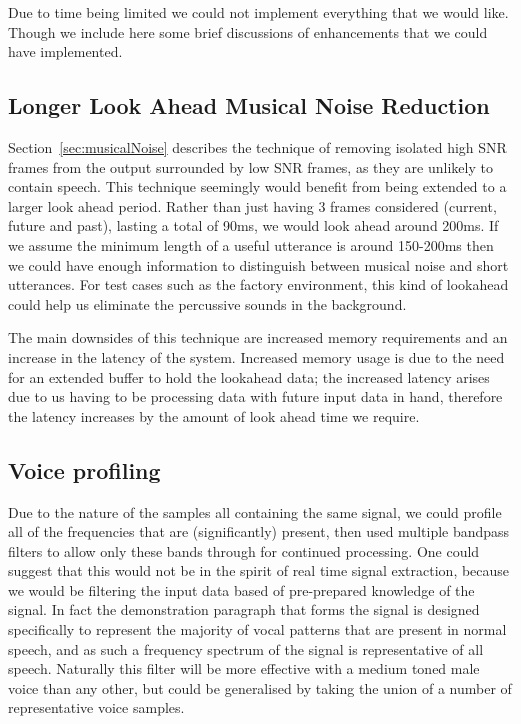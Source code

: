 \documentclass[11pt]{article} %
\begin{document}
{Due to time being limited we could not implement everything that we would like. Though we include here some brief discussions of enhancements that we could have implemented. 

\subsection{Longer Look Ahead Musical Noise Reduction}
Section~\ref{sec:musicalNoise} describes the technique of removing isolated high SNR frames from the output surrounded by low SNR frames, as they are unlikely to contain speech. This technique seemingly would benefit from being extended to a larger look ahead period. Rather than just having 3 frames considered (current, future and past), lasting a total of 90ms, we would look ahead around 200ms.
If we assume the minimum length of a useful utterance is around 150-200ms then we could have enough information to distinguish between musical noise and short utterances. For test cases such as the factory environment, this kind of lookahead could help us eliminate the percussive sounds in the background. 

The main downsides of this technique are increased memory requirements and an increase in the latency of the system. Increased memory usage is due to the need for an extended buffer to hold the lookahead data; the increased latency arises due to us having to be processing data with future input data in hand, therefore the latency increases by the amount of look ahead time we require. 

\subsection{Voice profiling}
Due to the nature of the samples all containing the same signal, we could profile all of the frequencies that are (significantly) present, then used multiple bandpass filters to allow only these bands through for continued processing. One could suggest that this would not be in the spirit of real time signal extraction, because we would be filtering the input data based of pre-prepared knowledge of the signal. In fact the demonstration paragraph that forms the signal is designed specifically to represent the majority of vocal patterns that are present in normal speech, and as such a frequency spectrum of the signal is representative of all speech. Naturally this filter will be more effective with a medium toned male voice than any other, but could be generalised by taking the union of a number of representative voice samples. 

}
\end{document}
